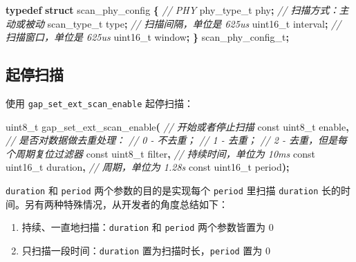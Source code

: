 \documentclass[
  12pt,
]{book}
\newenvironment{Shaded}{\begin{snugshade}}{\end{snugshade}}
\newcommand{\CommentTok}[1]{\textcolor[rgb]{0.56,0.35,0.01}{\textit{#1}}}
\newcommand{\DataTypeTok}[1]{\textcolor[rgb]{0.13,0.29,0.53}{#1}}
\newcommand{\KeywordTok}[1]{\textcolor[rgb]{0.13,0.29,0.53}{\textbf{#1}}}
\newcommand{\NormalTok}[1]{#1}
\newcommand{\OperatorTok}[1]{\textcolor[rgb]{0.81,0.36,0.00}{\textbf{#1}}}
\providecommand{\tightlist}{%
  \setlength{\itemsep}{0pt}\setlength{\parskip}{0pt}}
\begin{document}
\begin{Shaded}
\begin{Highlighting}[]
\KeywordTok{typedef} \KeywordTok{struct}\NormalTok{ scan\_phy\_config}
\OperatorTok{\{}
    \CommentTok{// PHY}
\NormalTok{    phy\_type\_t phy}\OperatorTok{;}
    \CommentTok{// 扫描方式：主动或被动}
\NormalTok{    scan\_type\_t type}\OperatorTok{;}
    \CommentTok{// 扫描间隔，单位是 625us}
    \DataTypeTok{uint16\_t}\NormalTok{ interval}\OperatorTok{;}
    \CommentTok{// 扫描窗口，单位是 625us}
    \DataTypeTok{uint16\_t}\NormalTok{ window}\OperatorTok{;}
\OperatorTok{\}}\NormalTok{ scan\_phy\_config\_t}\OperatorTok{;}
\end{Highlighting}
\end{Shaded}

\hypertarget{ux8d77ux505cux626bux63cf}{%
\subsection{起停扫描}\label{ux8d77ux505cux626bux63cf}}

使用 \texttt{gap\_set\_ext\_scan\_enable} 起停扫描：

\begin{Shaded}
\begin{Highlighting}[]
\DataTypeTok{uint8\_t}\NormalTok{ gap\_set\_ext\_scan\_enable}\OperatorTok{(}
  \CommentTok{// 开始或者停止扫描}
  \DataTypeTok{const} \DataTypeTok{uint8\_t}\NormalTok{ enable}\OperatorTok{,}
  \CommentTok{// 是否对数据做去重处理：}
  \CommentTok{// 0 {-} 不去重；}
  \CommentTok{// 1 {-} 去重；}
  \CommentTok{// 2 {-} 去重，但是每个周期复位过滤器}
  \DataTypeTok{const} \DataTypeTok{uint8\_t}\NormalTok{ filter}\OperatorTok{,}
  \CommentTok{// 持续时间，单位为 10ms}
  \DataTypeTok{const} \DataTypeTok{uint16\_t}\NormalTok{ duration}\OperatorTok{,}
  \CommentTok{// 周期，单位为 1.28s}
  \DataTypeTok{const} \DataTypeTok{uint16\_t}\NormalTok{ period}\OperatorTok{);}
\end{Highlighting}
\end{Shaded}

\texttt{duration} 和 \texttt{period} 两个参数的目的是实现每个 \texttt{period} 里扫描 \texttt{duration} 长的时间。另有两种特殊情况，从开发者的角度总结如下：

\begin{enumerate}
\def\labelenumi{\arabic{enumi}.}
\tightlist
\item
  持续、一直地扫描：\texttt{duration} 和 \texttt{period} 两个参数皆置为 \(0\)
\item
  只扫描一段时间：\texttt{duration} 置为扫描时长，\texttt{period} 置为 \(0\)
\end{enumerate}
\end{document}
